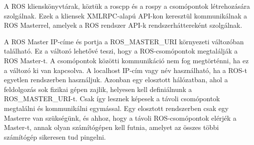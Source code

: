 \documentclass{article}
\begin{document}
A ROS klienskönyvtárak, köztük a roscpp és a rospy a csomópontok létrehozására szolgálnak. Ezek a kliensek XMLRPC-alapú API-kon keresztül kommunikálnak a ROS Masterrel, amelyek a ROS rendszer API-k rendszerháttereként szolgálnak.

A ROS Master IP-címe és portja a ROS\_MASTER\_URI környezeti változóban található. Ez a változó lehetővé teszi, hogy a ROS-csomópontok megtalálják a ROS Master-t. A csomópontok közötti kommunikáció nem fog megtörténni, ha ez a változó ki van kapcsolva. A localhost IP-cím vagy név használható, ha a ROS-t egyetlen rendszerben használjuk. Azonban egy elosztott hálózatban, ahol a feldolgozás sok fizikai gépen zajlik, helyesen kell definiálnunk a ROS\_MASTER\_URI-t. Csak így lesznek képesek a távoli csomópontok megtalálni és kommunikálni egymással. Egy elosztott rendszerben csak egy Masterre van szükségünk, és ahhoz, hogy a távoli ROS-csomópontok elérjék a Master-t, annak olyan számítógépen kell futnia, amelyet az összes többi számítógép sikeresen tud pingelni.
\cite{joseph:ros}

\end{document}
